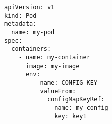 \begin{verbatim}
apiVersion: v1
kind: Pod
metadata:
  name: my-pod
spec:
  containers:
    - name: my-container
      image: my-image
      env:
        - name: CONFIG_KEY
          valueFrom:
            configMapKeyRef:
              name: my-config
              key: key1
\end{verbatim}

